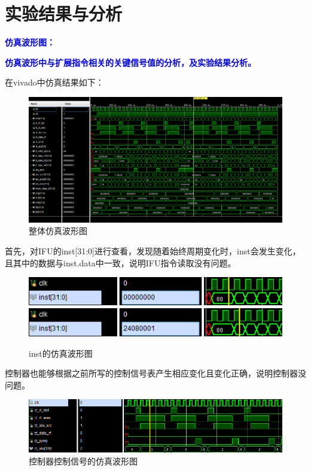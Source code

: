 \documentclass[]{USTBReport}
\newcommand{\hl}[1]{\textbf{\textcolor{blue}{#1}}}
\begin{document}
    \section{实验结果与分析}
    \hl{仿真波形图：}

    \hl{仿真波形中与扩展指令相关的关键信号值的分析，及实验结果分析。}

    在vivado中仿真结果如下：
    \begin{figure}[H]
        \centering
        \includegraphics[width=\linewidth]{figure/image2}
        \caption{整体仿真波形图}
    \end{figure}
    首先，对IFU的inst[31:0]进行查看，发现随着始终周期变化时，inst会发生变化，且其中的数据与inst.data中一致，说明IFU指令读取没有问题。

    \begin{figure}[H]
        \centering
        \includegraphics[width=\linewidth]{figure/image3}
        \includegraphics[width=\linewidth]{figure/image4}
        \caption{inst的仿真波形图}
    \end{figure}

    控制器也能够根据之前所写的控制信号表产生相应变化且变化正确，说明控制器没问题。
    \begin{figure}[H]
        \centering
        \includegraphics[width=\linewidth]{figure/image5}
        \caption{控制器控制信号的仿真波形图}
    \end{figure}
\end{document}
